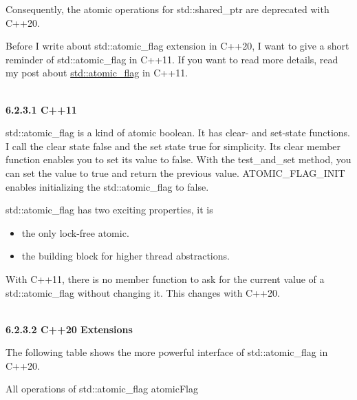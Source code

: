 Consequently, the atomic operations for std::shared\_ptr are deprecated with C++20.


Before I write about std::atomic\_flag extension in C++20, I want to give a short reminder of std::atomic\_flag in C++11. If you want to read more details, read my post about \href{https://www.modernescpp.com/index.php/the-atomic-flag}{std::atomic\_flag} in C++11.

\hspace*{\fill} \\ %
\noindent
\textbf{6.2.3.1\hspace{0.2cm}  C++11}

std::atomic\_flag is a kind of atomic boolean. It has clear- and set-state functions. I call the clear state false and the set state true for simplicity. Its clear member function enables you to set its value to false. With the test\_and\_set method, you can set the value to true and return the previous value. ATOMIC\_FLAG\_INIT enables initializing the std::atomic\_flag to false.

std::atomic\_flag has two exciting properties, it is

\begin{itemize}
\item 
the only lock-free atomic.

\item 
the building block for higher thread abstractions.
\end{itemize}

With C++11, there is no member function to ask for the current value of a std::atomic\_flag without changing it. This changes with C++20.

\hspace*{\fill} \\ %
\noindent
\textbf{6.2.3.2\hspace{0.2cm} C++20 Extensions}

The following table shows the more powerful interface of std::atomic\_flag in C++20.

\begin{center}
All operations of std::atomic\_flag atomicFlag
\end{center}

